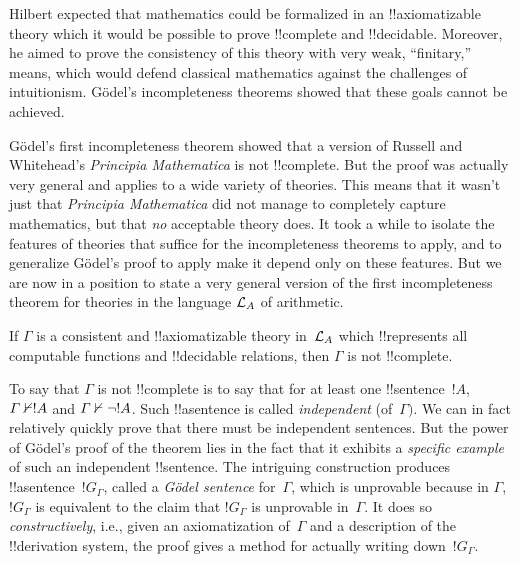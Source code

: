 \documentclass[../../../include/open-logic-section]{subfiles}
\begin{document}


Hilbert expected that mathematics could be formalized in an
!!{axiomatizable} theory which it would be possible to prove
!!{complete} and !!{decidable}. Moreover, he aimed to prove the
consistency of this theory with very weak, ``finitary,'' means, which
would defend classical mathematics against the challenges of
intuitionism.  G\"odel's incompleteness theorems showed that these
goals cannot be achieved.

G\"odel's first incompleteness theorem showed that a version of
Russell and Whitehead's \emph{Principia Mathematica} is not
!!{complete}.  But the proof was actually very general and applies to
a wide variety of theories.  This means that it wasn't just that
\emph{Principia Mathematica} did not manage to completely capture
mathematics, but that \emph{no} acceptable theory does.  It took a
while to isolate the features of theories that suffice for the
incompleteness theorems to apply, and to generalize G\"odel's proof to
apply make it depend only on these features.  But we are now in a
position to state a very general version of the first incompleteness
theorem for theories in the language $\Lang L_A$ of arithmetic.

\begin{thm}
If $\Gamma$ is a consistent and !!{axiomatizable} theory in~$\Lang
L_A$ which !!{represents} all computable functions and !!{decidable}
relations, then $\Gamma$ is not !!{complete}.
\end{thm}

To say that $\Gamma$ is not !!{complete} is to say that for at least
one !!{sentence}~$!A$, $\Gamma \Proves/ !A$ and $\Gamma \Proves/ \lnot
!A$.  Such !!a{sentence} is called \emph{independent} (of~$\Gamma)$.
We can in fact relatively quickly prove that there must be independent
sentences. But the power of G\"odel's proof of the theorem lies in the
fact that it exhibits a \emph{specific example} of such an independent
!!{sentence}. The intriguing construction produces
!!a{sentence}~$!G_\Gamma$, called a \emph{G\"odel sentence}
for~$\Gamma$, which is unprovable because in $\Gamma$, $!G_\Gamma$ is
equivalent to the claim that $!G_\Gamma$ is unprovable in~$\Gamma$.  It
does so \emph{constructively}, i.e., given an axiomatization
of~$\Gamma$ and a description of the !!{derivation} system, the proof gives a
method for actually writing down~$!G_\Gamma$.
\end{document}
